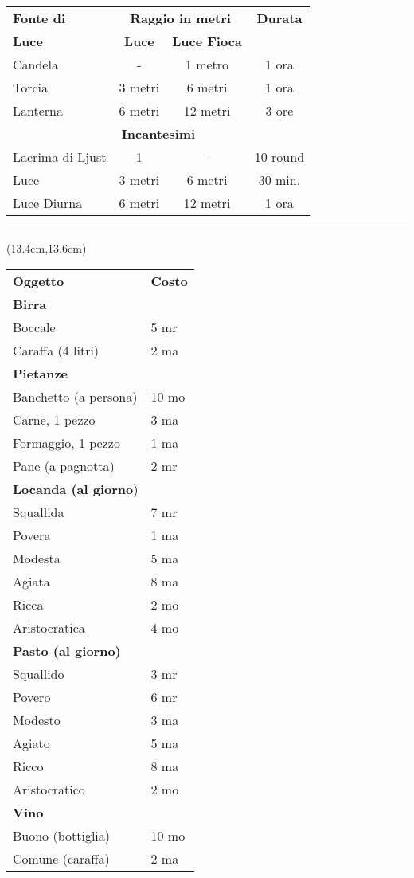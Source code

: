 \documentclass[a4paper,12 pt,openany]{book}
\newcommand{\riga}{\rule{\textwidth}{0.4pt}}
\begin{document}
\begin{textblock*}{12cm}
\begin{tabular}{l|cc|c}
\textbf{Fonte di} &\multicolumn{2}{c}{\textbf{Raggio in metri}}& \textbf{Durata}  \\
\textbf{Luce}& \textbf{Luce} & \textbf{Luce Fioca} &\\
Candela & - & 1 metro & 1 ora\\
Torcia & 3 metri & 6 metri & 1 ora\\
Lanterna & 6 metri & 12 metri & 3 ore \\
\multicolumn{4}{c}{\textbf{Incantesimi}}\\
Lacrima di Ljust & 1 & - & 10 round\\
Luce  & 3 metri & 6 metri &30 min. \\
Luce Diurna & 6 metri & 12 metri & 1 ora 
\end{tabular}
	


\riga

\end{textblock*}

\begin{textblock*}{6cm}(13.4cm,13.6cm) %

\begin{tabular}{ll}
\textbf{Oggetto}&\textbf{Costo}\\
\textbf{Birra}&\\
Boccale&5 mr\\
Caraffa (4 litri)&2 ma\\
\textbf{Pietanze} &\\
Banchetto (a persona)&10 mo\\
Carne, 1 pezzo&3 ma\\
Formaggio, 1 pezzo&1 ma\\
Pane (a pagnotta)&2 mr\\
\textbf{Locanda (al giorno})&\\
Squallida&7 mr\\
Povera&1 ma\\
Modesta&5 ma\\
Agiata&8 ma\\
Ricca&2 mo\\
Aristocratica&4 mo\\
\textbf{Pasto (al giorno)}&\\
Squallido&3 mr\\
Povero&6 mr\\
Modesto&3 ma\\
Agiato&5 ma\\
Ricco&8 ma\\
Aristocratico&2 mo\\
\textbf{Vino}&\\
Buono (bottiglia)&10 mo\\
Comune (caraffa)&2 ma\\
\end{tabular}

\end{textblock*}
\end{document}
